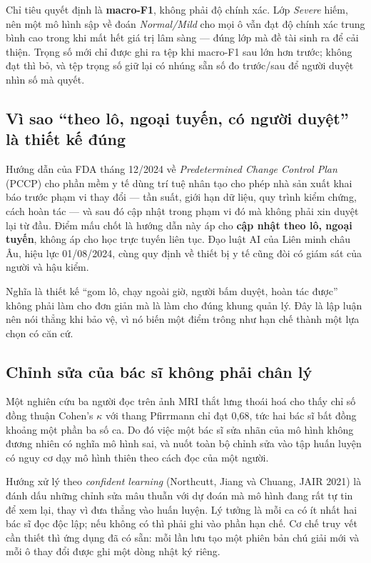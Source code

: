 \documentclass[11pt,a4paper]{article}
\begin{document}
Chỉ tiêu quyết định là \textbf{macro-F1}, không phải độ chính xác. Lớp \textit{Severe} hiếm, nên một
mô hình sập về đoán \textit{Normal/Mild} cho mọi ô vẫn đạt độ chính xác trung bình cao trong khi mất
hết giá trị lâm sàng --- đúng lớp mà đề tài sinh ra để cải thiện. Trọng số mới chỉ được ghi ra tệp
khi macro-F1 sau lớn hơn trước; không đạt thì bỏ, và tệp trọng số giữ lại có nhúng sẵn số đo
trước/sau để người duyệt nhìn số mà quyết.

\subsection{Vì sao ``theo lô, ngoại tuyến, có người duyệt'' là thiết kế đúng}

Hướng dẫn của FDA tháng 12/2024 về \textit{Predetermined Change Control Plan} (PCCP) cho phần mềm
y tế dùng trí tuệ nhân tạo cho phép nhà sản xuất khai báo trước phạm vi thay đổi --- tần suất, giới
hạn dữ liệu, quy trình kiểm chứng, cách hoàn tác --- và sau đó cập nhật trong phạm vi đó mà không
phải xin duyệt lại từ đầu. Điểm mấu chốt là hướng dẫn này áp cho \textbf{cập nhật theo lô, ngoại
tuyến}, không áp cho học trực tuyến liên tục. Đạo luật AI của Liên minh châu Âu, hiệu lực
01/08/2024, cùng quy định về thiết bị y tế cũng đòi có giám sát của người và hậu kiểm.

Nghĩa là thiết kế ``gom lô, chạy ngoài giờ, người bấm duyệt, hoàn tác được'' không phải làm cho
đơn giản mà là làm cho đúng khung quản lý. Đây là lập luận nên nói thẳng khi bảo vệ, vì nó biến một
điểm trông như hạn chế thành một lựa chọn có căn cứ.

\subsection{Chỉnh sửa của bác sĩ không phải chân lý}

Một nghiên cứu ba người đọc trên ảnh MRI thắt lưng thoái hoá cho thấy chỉ số đồng thuận Cohen's
$\kappa$ với thang Pfirrmann chỉ đạt 0{,}68, tức hai bác sĩ bất đồng khoảng một phần ba số ca.
Do đó việc một bác sĩ sửa nhãn của mô hình không đương nhiên có nghĩa mô hình sai, và nuốt toàn bộ
chỉnh sửa vào tập huấn luyện có nguy cơ dạy mô hình thiên theo cách đọc của một người.

Hướng xử lý theo \textit{confident learning} (Northcutt, Jiang và Chuang, JAIR 2021) là đánh dấu
những chỉnh sửa mâu thuẫn với dự đoán mà mô hình đang rất tự tin để xem lại, thay vì đưa thẳng vào
huấn luyện. Lý tưởng là mỗi ca có ít nhất hai bác sĩ đọc độc lập; nếu không có thì phải ghi vào
phần hạn chế. Cơ chế truy vết cần thiết thì ứng dụng đã có sẵn: mỗi lần lưu tạo một phiên bản chú
giải mới và mỗi ô thay đổi được ghi một dòng nhật ký riêng.
\end{document}
